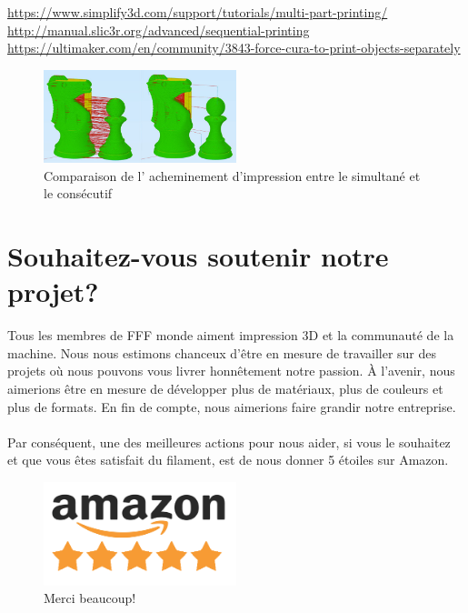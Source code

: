 \documentclass[11pt,a4paper]{article}
\begin{document}
\url{https://www.simplify3d.com/support/tutorials/multi-part-printing/}\\
\url{http://manual.slic3r.org/advanced/sequential-printing}\\
\url{https://ultimaker.com/en/community/3843-force-cura-to-print-objects-separately}
\begin{figure}[H]
  \centering
\includegraphics[width=0.5\textwidth,cfbox=azul_marcos 4pt 0pt]{FOTOS/SEQUENTIALPRINTING}
\caption*{Comparaison de l’ acheminement d’impression entre le simultané et le consécutif}
\end{figure}
\section{Souhaitez-vous soutenir notre projet?}
Tous les membres de FFF monde aiment impression 3D et la communauté de la machine. Nous nous estimons chanceux d’être en mesure de travailler sur des projets où nous pouvons vous livrer honnêtement notre passion. À l’avenir, nous aimerions être en mesure de développer plus de matériaux, plus de couleurs et plus de formats. En fin de compte, nous aimerions faire grandir notre entreprise.
\\\\
Par conséquent, une des meilleures actions pour nous aider, si vous le souhaitez et que vous êtes satisfait du filament, est de nous donner 5 étoiles sur Amazon.
\begin{figure}[H]
\centering
\includegraphics[width=0.5\textwidth,cfbox=azul_marcos 1pt 0pt]{FOTOS/AMAZON_FIVE_STARS}
\caption*{Merci beaucoup!}
\end{figure}
\end{document}
